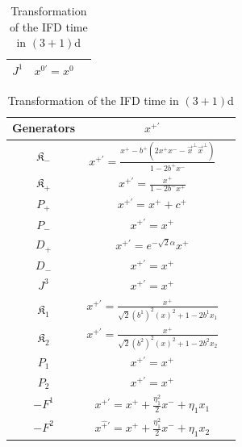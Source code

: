 \documentclass[%
 reprint,
superscriptaddress,
 amsmath,amssymb,
 aps,
]{revtex4-2}
\begin{document}
\begin{widetext}
\begin{center}
\begin{table}[!htb]
\begin{minipage}{.5\linewidth}
\begin{tabular}{|c||c|c|}
               \rule{0pt}{16pt} $J^{1}$ & $ x^{{0}\prime}=x^{{0}}$ \\
               \hline
        \end{tabular}
        \caption{Transformation of the IFD time in $(3+1)$d}
        \label{tablex0prime}
        \end{minipage}%
    \begin{minipage}{.5\linewidth}
        \begin{tabular}{|c||c|c|}
        \hline
             \rule{0pt}{16pt} Generators & $x^{{+}\prime}$\\
             \hline
             \hline
            \rule{0pt}{16pt} $\mathfrak{K}_{{-}}$ & $x^{{+}\prime}=\frac{x^{{+}}-b^{{+}}(2x^{+}x^{-}-\vec{x}^{\perp}\vec{x}^{\perp})}{1-2b^{{+}}x^{{-}}}$\\
             \hline
            \rule{0pt}{16pt} $\mathfrak{K}_{{+}}$ & $x^{{+}\prime}=\frac{x^{{+}}}{1-2b^{{-}}x^{{+}}}$ \\
             \hline
             \rule{0pt}{16pt} $P_{{+}}$& $x^{{+}\prime}=x^{{+}}+c^{{+}} $\\
             \hline
             \rule{0pt}{16pt} $P_{{-}}$& $x^{{+}\prime}=x^{{+}}$  \\
             \hline
             \rule{0pt}{16pt} $D_{{+}}$ & $x^{{+}\prime} = e^{-\sqrt{2}\alpha}x^{{+}}$ \\
             \hline
             \rule{0pt}{16pt} $D_{{-}}$ & $x^{{+}\prime} = x^{{+}}$ \\
             \hline
             \rule{0pt}{16pt} $J^{3}$ & $ x^{{+}\prime}=x^{{+}}$ \\
             \hline
             \rule{0pt}{16pt} $\mathfrak{K}_{1}$ & $x^{{+}\prime}=\frac{x^{{{+}}}}{ \sqrt{2}(b^{1})^{2}(x)^2+1-2b^{1}x_{1}}$ \\
             \hline
             \rule{0pt}{16pt} $\mathfrak{K}_{2}$ &  $x^{{+}\prime}=\frac{x^{{{+}}}}{ \sqrt{2}(b^{2})^{2}(x)^2+1-2b^{2}x_{2}}$ \\
             \hline
              \rule{0pt}{16pt} $P_{1}$ & $ x^{{+}\prime}=x^{{+}}$  \\
              \hline
              \rule{0pt}{16pt} $P_{2}$ & $ x^{{+}\prime}=x^{{+}}$  \\
              \hline
               \rule{0pt}{16pt} $-F^{1}$ &  $x^{{+}\prime}=x^{{+}}+\frac{\eta_{1}^2}{2}x^{{-}}+\eta_{1}x_{{1}}$ \\
               \hline
               \rule{0pt}{16pt} $-F^{2}$ & $ x^{\hat{+}\prime}=x^{{+}}+\frac{\eta_{1}^2}{2}x^{{-}}+\eta_{1}x_{{2}}$ \\

\end{tabular}
\end{minipage}
\end{table}
\end{center}
\end{widetext}
\end{document}
